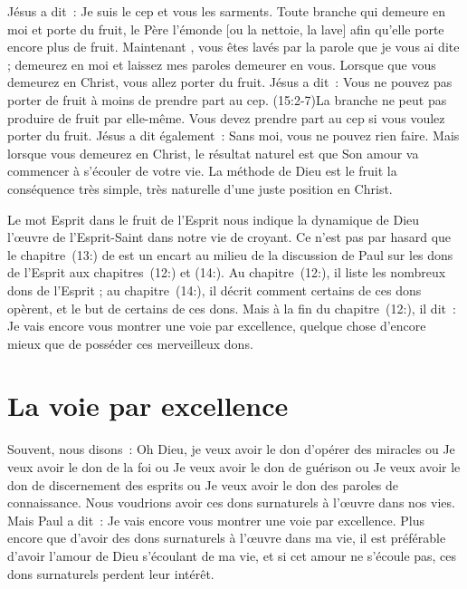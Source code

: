 Jésus a dit~: \og Je suis le cep et vous les sarments.
 Toute branche qui demeure en moi et porte du fruit,
 le Père l'émonde [ou la nettoie, la lave] afin qu'elle porte
 encore plus de fruit. Maintenant , vous êtes lavés par la parole
 que je vous ai dite ; demeurez en moi et laissez mes paroles
 demeurer en vous. \fg{}
 Lorsque que vous demeurez en Christ, vous allez porter du fruit.
 Jésus a dit~: \og Vous ne pouvez pas porter de fruit à moins
 de prendre part au cep. \fg{} (15:2-7)La branche
 ne peut pas produire de fruit par elle-même.
 Vous devez prendre part au cep si vous voulez porter du fruit.
 Jésus a dit également~: \og Sans moi, vous ne pouvez rien faire. \fg{}
 Mais lorsque vous demeurez en Christ, le résultat naturel
 est que Son amour va commencer à s'écouler de votre vie.
 La méthode de Dieu est le fruit \ocadr la conséquence très simple,
 très naturelle d'une juste position en Christ.

Le mot \og Esprit \fg{} dans \og le fruit de l'Esprit \fg{}
 nous indique la dynamique de Dieu \ocadr l'œuvre de l'Esprit-Saint
 dans notre vie de croyant. Ce n'est pas par hasard que le
 chapitre~(13:) de  est un encart
 au milieu de la discussion de Paul sur les dons de l'Esprit
 aux chapitres~(12:) et (14:).
 Au chapitre~(12:), il liste les nombreux dons de l'Esprit ;
 au chapitre~(14:), il décrit comment certains de ces dons
 opèrent, et le but de certains de ces dons.
 Mais à la fin du chapitre~(12:), il dit~:
 \og Je vais encore vous montrer une voie par excellence, \fg{}
 quelque chose d'encore mieux que de posséder ces merveilleux dons.


\section{La voie par excellence}

Souvent, nous disons~:
 \og Oh Dieu, je veux avoir le don d'opérer des miracles \fg{} ou
 \og Je veux avoir le don de la foi \fg{} ou
 \og Je veux avoir le don de guérison \fg{} ou
 \og Je veux avoir le don de discernement des esprits \fg{} ou
 \og Je veux avoir le don des paroles de connaissance. \fg{}
 Nous voudrions avoir ces dons surnaturels à l'œuvre dans nos vies.
 Mais Paul a dit~:
 \og Je vais encore vous montrer une voie par excellence. \fg{}
 Plus encore que d'avoir des dons surnaturels à l'œuvre dans ma vie,
 il est préférable d'avoir l'amour de Dieu s'écoulant de ma vie,
 et si cet amour ne s'écoule pas, ces dons surnaturels perdent leur intérêt.

